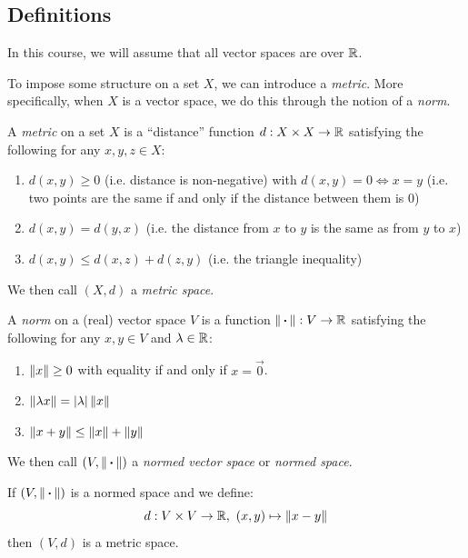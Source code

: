 \documentclass[../main.tex]{subfiles}
\begin{document}
\subsection{Definitions}
\begin{remark}[Note]
  In this course, we will assume that all vector spaces are over $\mathbb{R}$.
\end{remark}
To impose some structure on a set $X$, we can introduce a \textit{metric}.
More specifically, when $X$ is a vector space, we do this through the notion of a \textit{norm}.
\begin{definition}[Metric]
  A \textit{metric} on a set $X$ is a ``distance'' function $d: X \times X \to \mathbb{R}$ satisfying the following for any $x, y, z \in X$: \label{metricDef}
  \begin{enumerate}
    \item $d(x, y) \geq 0$ (i.e. distance is non-negative) with $d(x, y) = 0 \iff x = y$ (i.e. two points are the same if and only if the distance between them is 0)
    \item $d(x, y) = d(y, x)$ (i.e. the distance from $x$ to $y$ is the same as from $y$ to $x$)
    \item $d(x, y) \leq d(x, z) + d(z, y)$ (i.e. the triangle inequality)
  \end{enumerate}
  We then call $(X, d)$ a \textit{metric space}.
\end{definition}
\begin{definition}[Norm]
  A \textit{norm} on a (real) vector space $V$ is a function $\left\lVert {\hspace{0.18em}\boldsymbol{\cdot}\hspace{0.18em}} \right\rVert: V \to \mathbb{R}$ satisfying the following for any $x, y \in V$ and $\lambda \in \mathbb{R}$: \label{normDef}
  \begin{enumerate}
    \item $\left\lVert x \right\rVert \geq 0$ with equality if and only if $x = \vec{0}$.
    \item $\left\lVert \lambda x \right\rVert = |\lambda| \left\lVert x \right\rVert$
    \item $\left\lVert x + y \right\rVert \leq \left\lVert x \right\rVert + \left\lVert y \right\rVert$
  \end{enumerate}
  We then call $(V, \left\lVert {\hspace{0.18em}\boldsymbol{\cdot}\hspace{0.18em}} \right\rVert)$ a \textit{normed vector space} or \textit{normed space}.
\end{definition}
\begin{proposition}
  If $(V, \left\lVert {\hspace{0.18em}\boldsymbol{\cdot}\hspace{0.18em}} \right\rVert)$ is a normed space and we define: \label{normToMetric}
  \[
    d: V \times V \to \mathbb{R},\ (x, y) \mapsto \left\lVert x - y \right\rVert
  \]
  then $(V, d)$ is a metric space.
\end{proposition}
\end{document}
